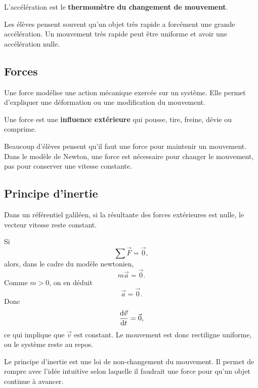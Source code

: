 \documentclass[11pt,a4paper]{article}
\begin{document}
\begin{imagem}
L'accélération est le \textbf{thermomètre du changement de mouvement}.
\end{imagem}

\begin{fausseintuition}
Les élèves pensent souvent qu'un objet très rapide a forcément une grande accélération.
Un mouvement très rapide peut être uniforme et avoir une accélération nulle.
\end{fausseintuition}

\subsection{Forces}

\begin{sens}
Une force modélise une action mécanique exercée sur un système.
Elle permet d'expliquer une déformation ou une modification du mouvement.
\end{sens}

\begin{imagem}
Une force est une \textbf{influence extérieure} qui pousse, tire, freine, dévie ou comprime.
\end{imagem}

\begin{fausseintuition}
Beaucoup d'élèves pensent qu'il faut une force pour maintenir un mouvement.
Dans le modèle de Newton, une force est nécessaire pour changer le mouvement, pas pour conserver une vitesse constante.
\end{fausseintuition}

\subsection{Principe d'inertie}

\begin{bilan}
Dans un référentiel galiléen, si la résultante des forces extérieures est nulle,
le vecteur vitesse reste constant.
\end{bilan}

\begin{demo}
Si
\[
\sum \vec F = \vec 0,
\]
alors, dans le cadre du modèle newtonien,
\[
m\vec a=\vec 0.
\]
Comme \(m>0\), on en déduit
\[
\vec a=\vec 0.
\]
Donc
\[
\dv{\vec v}{t}=\vec 0,
\]
ce qui implique que \(\vec v\) est constant.
Le mouvement est donc rectiligne uniforme, ou le système reste au repos.
\end{demo}

\begin{modele}
Le principe d'inertie est une loi de non-changement du mouvement.
Il permet de rompre avec l'idée intuitive selon laquelle il faudrait une force pour qu'un objet continue à avancer.
\end{modele}
\end{document}
